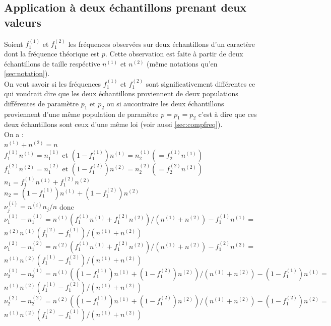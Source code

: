 \documentclass[a4paper,11pt]{book}
\begin{document}
\subsection{Application \`a deux \'echantillons prenant deux valeurs}\label{sec:chi2freq}
Soient $f_1^{(1)}$ et $f_1^{(2)}$ les fr\'equences observ\'ees sur deux 
\'echantillons d'un caract\`ere dont la fr\'equence th\'eorique est $p$. Cette 
observation est faite \`a partir de deux \'echantillons de taille resp\'ective 
$n^{(1)}$ et $n^{(2)}$ (m\^eme notations qu'en \ref{sec:notation}).\\
On veut savoir si les fr\'equences $f_1^{(1)}$ et $f_1^{(2)}$ sont 
significativement diff\'erentes ce qui voudrait dire que les deux 
\'echantillons proviennent de deux populations diff\'erentes de param\`etre 
$p_1$ et $p_2$ ou si aucontraire les deux \'echantillons proviennent d'une 
m\^eme population de param\`etre $p=p_1=p_2$ c'est \`a dire que ces deux 
\'echantillons sont ceux d'une m\^eme loi (voir aussi \ref{sec:compfreq}).\\
On a :\\
$n^{(1)}+n^{(2)}=n$\\
 $f_1^{(1)}n^{(1)}=n_1^{(1)}$ et  $(1-f_1^{(1)})n^{(1)}=n_2^{(1)}(=f_2^{(1)}n^{(1)})$\\
$f_1^{(2)}n^{(2)}=n_1^{(2)}$ et  $(1-f_1^{(2)})n^{(2)}=n_2^{(2)}(=f_2^{(2)}n^{(2)})$\\
$n_1=f_1^{(1)}n^{(1)}+f_1^{(2)}n^{(2)}$\\
 $n_2=(1-f_1^{(1)})n^{(1)}+(1-f_1^{(2)})n^{(2)}$\\
$\nu_j^{(i)}=n^{(i)}n_j/n$ donc \\
$\nu_1^{(1)}-n_1^{(1)}=n^{(1)}(f_1^{(1)}n^{(1)}+f_1^{(2)}n^{(2)})/(n^{(1)}+n^{(2)})-f_1^{(1)}n^{(1)}=$\\
$n^{(2)}n^{(1)}(f_1^{(2)}-f_1^{(1)})/(n^{(1)}+n^{(2)})$\\
$\nu_1^{(2)}-n_1^{(2)}=n^{(2)}(f_1^{(1)}n^{(1)}+f_1^{(2)}n^{(2)})/(n^{(1)}+n^{(2)})-f_1^{(2)}n^{(2)}=$\\
$n^{(1)}n^{(2)}(f_1^{(1)}-f_1^{(2)})/(n^{(1)}+n^{(2)})$\\
$\nu_2^{(1)}-n_2^{(1)}=n^{(1)}((1-f_1^{(1)})n^{(1)}+(1-f_1^{(2)})n^{(2)})/(n^{(1)}+n^{(2)})-(1-f_1^{(1)})n^{(1)}=$\\
$n^{(1)}n^{(2)}(f_1^{(1)}-f_1^{(2)})/(n^{(1)}+n^{(2)})$\\
$\nu_2^{(2)}-n_2^{(2)}=n^{(2)}((1-f_1^{(1)})n^{(1)}+(1-f_1^{(2)})n^{(2)})/(n^{(1)}+n^{(2)})-(1-f_1^{(2)})n^{(2)}=$\\
$n^{(1)}n^{(2)}(f_1^{(2)}-f_1^{(1)})/(n^{(1)}+n^{(2)})$\\
\end{document}
